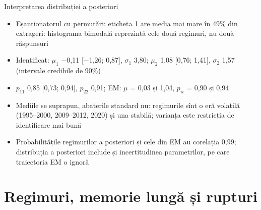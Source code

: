 \begin{frame}{Interpretarea distribuției a posteriori}
\itemsize{\footnotesize}
\begin{itemize}
    \item Eșantionatorul cu permutări: eticheta 1 are media mai mare în 49\% din extrageri: histograma bimodală reprezintă cele două regimuri, nu două răspunsuri
    \item Identificat: $\mu_1$ \ensuremath{-}0{,}11 [\ensuremath{-}1{,}26; 0{,}87], $\sigma_1$ 3{,}80; $\mu_2$ 1{,}08 [0{,}76; 1{,}41], $\sigma_2$ 1{,}57 (intervale credibile de 90\%)
    \item $p_{11}$ 0{,}85 [0{,}73; 0{,}94], $p_{22}$ 0{,}91; EM: $\mu$ = 0{,}03 și 1{,}04, $p_{ii}$ = 0{,}90 și 0{,}94
    \item Mediile se suprapun, abaterile standard nu: regimurile sînt o eră volatilă (1995--2000, 2009--2012, 2020) și una stabilă; varianța este restricția de identificare mai bună
    \item Probabilitățile regimurilor a posteriori și cele din EM au corelația 0{,}99; distribuția a posteriori include și incertitudinea parametrilor, pe care traiectoria EM o ignoră
\end{itemize}
\end{frame}


\section{Regimuri, memorie lungă și rupturi}

